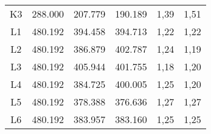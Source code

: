 \begin{center}
\begin{longtable}{cccccc}
    K3    & 288.000 & 207.779 & 190.189 & 1,39  & 1,51 \\
    L1    & 480.192 & 394.458 & 394.713 & 1,22  & 1,22 \\
    L2    & 480.192 & 386.879 & 402.787 & 1,24  & 1,19 \\
    L3    & 480.192 & 405.944 & 401.755 & 1,18  & 1,20 \\
    L4    & 480.192 & 384.725 & 400.005 & 1,25  & 1,20 \\
    L5    & 480.192 & 378.388 & 376.636 & 1,27  & 1,27 \\
    L6    & 480.192 & 383.957 & 383.160 & 1,25  & 1,25 \\
\end{longtable}
\end{center}

% 
% 
% 


